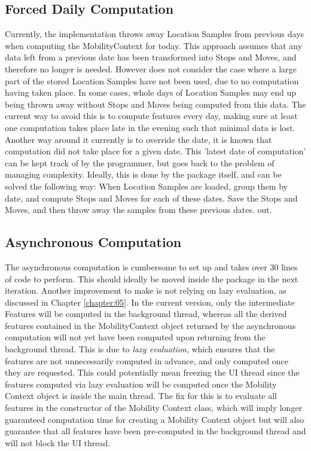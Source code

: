 \subsection{Forced Daily Computation}
Currently, the implementation throws away Location Samples from previous days when computing the MobilityContext for today. This approach assumes that any data left from a previous date has been transformed into Stops and Moves, and therefore no longer is needed. However does not consider the case where a large part of the stored Location Samples have not been used, due to no computation having taken place. In some cases, whole days of Location Samples may end up being thrown away without Stops and Moves being computed from this data. The current way to avoid this is to compute features every day, making sure at least one computation takes place late in the evening such that minimal data is lost. Another way around it currently is to override the date, it is known that computation did not take place for a given date. This 'latest date of computation' can be kept track of by the programmer, but goes back to the problem of managing complexity. Ideally, this is done by the package itself, and can be solved the following way:
When Location Samples are loaded, group them by date, and compute Stops and Moves for each of these dates. Save the Stops and Moves, and then throw away the samples from these previous dates. out.

\subsection{Asynchronous Computation}
The asynchronous computation is cumbersome to set up and takes over 30 lines of code to perform. This should ideally be moved inside the package in the next iteration. Another improvement to make is not relying on lazy evaluation, as discussed in Chapter \ref{chapter:05}. In the current version, only the intermediate Features will be computed in the background thread, whereas all the derived features contained in the MobilityContext object returned by the asynchronous computation will not yet have been computed upon returning from the background thread. This is due to \textit{lazy evaluation}, which ensures that the features are not unnecessarily computed in advance, and only computed once they are requested. This could potentially mean freezing the UI thread since the features computed via lazy evaluation will be computed once the Mobility Context object is inside the main thread. The fix for this is to evaluate all features in the constructor of the Mobility Context class, which will imply longer guaranteed computation time for creating a Mobility Context object but will also guarantee that all features have been pre-computed in the background thread and will not block the UI thread. 

